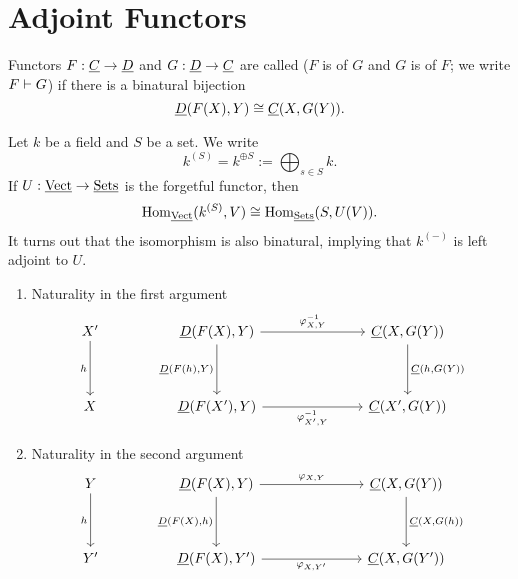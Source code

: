 
\section{Adjoint Functors}

\begin{definition*}
	Functors \( F: \underline{C} \to \underline{D} \) and \( G: \underline{D} \to \underline{C} \) are called  (\( F \) is  of \( G \) and \( G \) is  of \( F \); we write \( F \mathrel{\vdash} G \)) if there is a binatural bijection
	\[
		\underline{D}(F(X), Y) \cong \underline{C}(X, G(Y)).
	\]
\end{definition*}


Let \( k \) be a field and \( S \) be a set. We write
\[
	k^{(S)} = k^{\oplus S} := \bigoplus_{s \in S} k.
\]
If \( U: \operatorname{\underline{\mathrm{Vect}}} \to \underline{\mathrm{Sets}} \) is the forgetful functor, then
\[
	\operatorname{Hom}_{\operatorname{\underline{\mathrm{Vect}}}}(k^{(S)}, V) \cong \operatorname{Hom}_{\underline{\mathrm{Sets}}}(S, U(V)).
\]
It turns out that the isomorphism is also binatural, implying that \( k^{(-)} \) is left adjoint to \( U \).


\begin{enumerate}
	\item Naturality in the first argument
		\[
			\begin{tikzcd}{X'} && {\D(F(X), Y)} &&& {\C(X, G(Y))} \\
				\\
				X && {\D(F(X'), Y)} &&& {\C(X', G(Y))}
				\arrow["h"', from=1-1, to=3-1]
				\arrow["{\varphi^{-1}_{X, Y}}", from=1-3, to=1-6]
				\arrow["{\D(F(h), Y)}"', from=1-3, to=3-3]
				\arrow["{\C(h, G(Y))}", from=1-6, to=3-6]
				\arrow["{\varphi^{-1}_{X', Y}}"', from=3-3, to=3-6]
			\end{tikzcd}
		\]
	\item Naturality in the second argument
		\[
			\begin{tikzcd}
				Y && {\D(F(X), Y)} &&& {\C(X, G(Y))} \\
				\\
				{Y'} && {\D(F(X), Y')} &&& {\C(X, G(Y'))}
				\arrow["h"', from=1-1, to=3-1]
				\arrow["{\varphi_{X, Y}}", from=1-3, to=1-6]
				\arrow["{\D(F(X), h)}"', from=1-3, to=3-3]
				\arrow["{\C(X, G(h))}", from=1-6, to=3-6]
				\arrow["{\varphi_{X, Y'}}"', from=3-3, to=3-6]
			\end{tikzcd}
		\]
\end{enumerate}


